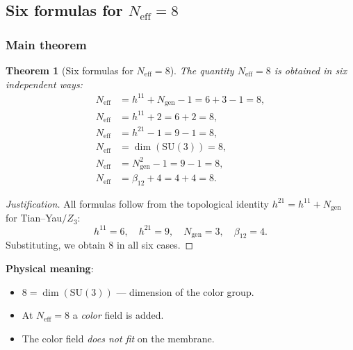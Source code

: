 \documentclass[11pt,a4paper]{article}
\newcommand{\SU}{\ensuremath{\mathrm{SU}}}
\newtheorem{theorem}{Theorem}[section]
\theoremstyle{definition}
\begin{document}
\subsection{Six formulas for \texorpdfstring{$N_{\text{eff}} = 8$}{N\_eff = 8}}
\label{subsec:frg-neff}

\subsubsection{Main theorem}

\begin{theorem}[Six formulas for $N_{\text{eff}} = 8$]
\label{thm:six-formulas}
The quantity $N_{\text{eff}} = 8$ is obtained in six independent ways:
\begin{align}
    N_{\text{eff}} &= h^{11} + N_{\text{gen}} - 1 = 6 + 3 - 1 = 8,
    \label{eq:neff-formula-1} \\[0.3em]
    N_{\text{eff}} &= h^{11} + 2 = 6 + 2 = 8,
    \label{eq:neff-formula-2} \\[0.3em]
    N_{\text{eff}} &= h^{21} - 1 = 9 - 1 = 8,
    \label{eq:neff-formula-3} \\[0.3em]
    N_{\text{eff}} &= \dim(\SU(3)) = 8,
    \label{eq:neff-formula-4} \\[0.3em]
    N_{\text{eff}} &= N_{\text{gen}}^2 - 1 = 9 - 1 = 8,
    \label{eq:neff-formula-5} \\[0.3em]
    N_{\text{eff}} &= \beta_{12} + 4 = 4 + 4 = 8.
    \label{eq:neff-formula-6}
\end{align}
\end{theorem}

\begin{proof}[Justification]
All formulas follow from the topological identity
$h^{21} = h^{11} + N_{\text{gen}}$ for Tian--Yau$/Z_3$:
\begin{equation}
    h^{11} = 6, \quad h^{21} = 9, \quad N_{\text{gen}} = 3, \quad
    \beta_{12} = 4.
\end{equation}
Substituting, we obtain 8 in all six cases.
\end{proof}

\medskip\noindent
\textbf{Physical meaning}:
\begin{itemize}
    \item $8 = \dim(\SU(3))$ --- dimension of the color group.
    \item At $N_{\text{eff}} = 8$ a \emph{color} field is added.
    \item The color field \emph{does not fit} on the membrane.
\end{itemize}
\end{document}
